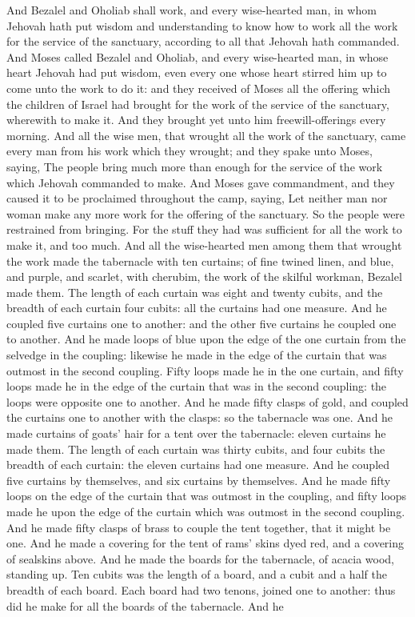 And Bezalel and Oholiab shall work, and every wise-hearted man, in whom Jehovah hath put wisdom and understanding to know how to work all the work for the service of the sanctuary, according to all that Jehovah hath commanded.  And Moses called Bezalel and Oholiab, and every wise-hearted man, in whose heart Jehovah had put wisdom, even every one whose heart stirred him up to come unto the work to do it: and they received of Moses all the offering which the children of Israel had brought for the work of the service of the sanctuary, wherewith to make it. And they brought yet unto him freewill-offerings every morning. And all the wise men, that wrought all the work of the sanctuary, came every man from his work which they wrought; and they spake unto Moses, saying, The people bring much more than enough for the service of the work which Jehovah commanded to make. And Moses gave commandment, and they caused it to be proclaimed throughout the camp, saying, Let neither man nor woman make any more work for the offering of the sanctuary. So the people were restrained from bringing. For the stuff they had was sufficient for all the work to make it, and too much.  And all the wise-hearted men among them that wrought the work made the tabernacle with ten curtains; of fine twined linen, and blue, and purple, and scarlet, with cherubim, the work of the skilful workman, Bezalel made them. The length of each curtain was eight and twenty cubits, and the breadth of each curtain four cubits: all the curtains had one measure. And he coupled five curtains one to another: and the other five curtains he coupled one to another. And he made loops of blue upon the edge of the one curtain from the selvedge in the coupling: likewise he made in the edge of the curtain that was outmost in the second coupling. Fifty loops made he in the one curtain, and fifty loops made he in the edge of the curtain that was in the second coupling: the loops were opposite one to another. And he made fifty clasps of gold, and coupled the curtains one to another with the clasps: so the tabernacle was one.  And he made curtains of goats’ hair for a tent over the tabernacle: eleven curtains he made them. The length of each curtain was thirty cubits, and four cubits the breadth of each curtain: the eleven curtains had one measure. And he coupled five curtains by themselves, and six curtains by themselves. And he made fifty loops on the edge of the curtain that was outmost in the coupling, and fifty loops made he upon the edge of the curtain which was outmost in the second coupling. And he made fifty clasps of brass to couple the tent together, that it might be one. And he made a covering for the tent of rams’ skins dyed red, and a covering of sealskins above.  And he made the boards for the tabernacle, of acacia wood, standing up. Ten cubits was the length of a board, and a cubit and a half the breadth of each board. Each board had two tenons, joined one to another: thus did he make for all the boards of the tabernacle. And he 